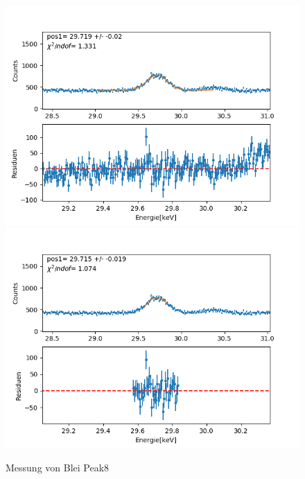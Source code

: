 \documentclass[12pt,a4paper]{article}
\begin{document}
\begin{figure}[H]
\centering
\includegraphics[scale=0.49]{Bilder/roentgen_spektren/blei/pb8_1.png}
\includegraphics[scale=0.49]{Bilder/roentgen_spektren/blei/pb8_2.png}
\caption{Messung von Blei Peak8}
\end{figure}

\newpage
\end{document}
